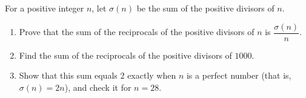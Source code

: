 For a positive integer $n$, let $\sigma(n)$ be the sum of the positive divisors of $n$.
\begin{enumerate}
\item[(a)] Prove that the sum of the reciprocals of the positive divisors of $n$ is $\dfrac{\sigma(n)}{n}$.
\item[(b)] Find the sum of the reciprocals of the positive divisors of $1000$.
\item[(c)] Show that this sum equals $2$ exactly when $n$ is a perfect number (that is, $\sigma(n)=2n$), and check it for $n=28$.
\end{enumerate}
